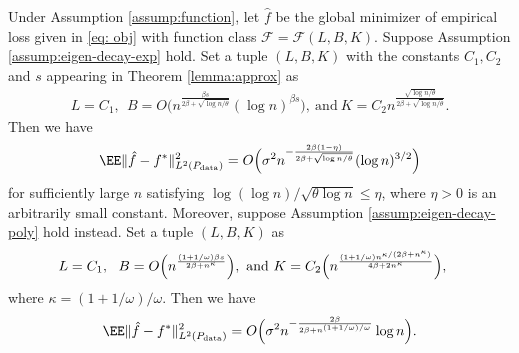 \begin{theorem}\label{thm:generalization-exp}
Under Assumption \ref{assump:function}, let $\hat{f}$ be the global minimizer of empirical loss given in \eqref{eq: obj} with function class 
$\mathcal{F}=\mathcal{F}(L,B,K)$. Suppose Assumption \ref{assump:eigen-decay-exp} hold. Set a tuple $(L,B,K)$ with the constants $C_1,C_2$ and $s$ appearing in Theorem \ref{lemma:approx} as 
\begin{equation*}
\begin{aligned}
    L= C_1,~~B = O\biggl(n^{\frac{\beta s}{2\beta+\sqrt{\log n/\theta}}} (\log n)^{\beta s} \biggr),~
    \text{and}~K = C_2 n^{\frac{\sqrt{\log n/\theta}}{2\beta + \sqrt{\log n/\theta} } }.
\end{aligned}
\end{equation*}
Then  we have 
\begin{equation*}
    \EE \norm{ \hat{f} - f^*}^2_{L^2(P_{\rm data})} = O\Bigl( \sigma^2 n^{- \frac{2\beta(1-\eta)}{2\beta+\sqrt{\log n/\theta}}}(\log n)^{3/2} \Bigr)
\end{equation*}
for sufficiently large $n$ satisfying $\log(\log n) / \sqrt{\theta \log n} \leq \eta$, where $\eta >0$ is an arbitrarily small constant.
Moreover, suppose Assumption \ref{assump:eigen-decay-poly} hold instead.  Set a tuple $(L,B,K)$ as \begin{equation*}
\begin{aligned}
        L= C_1,~~B&=O\Bigl(n^{\frac{(1+1/\omega)\beta s}{2\beta+ n^{\kappa}} } \Bigr),~\text{and}~K=C_2 \Bigl(n^{\frac{(1+1/\omega) n^{\kappa/(2\beta+n^\kappa)}}{4\beta + 2n^\kappa}} \Bigr),
\end{aligned}
\end{equation*}  
where $\kappa=(1+1/\omega)/\omega$. Then we have 
\begin{equation*}
     \EE \norm{ \hat{f} - f^*}^2_{L^2(P_{\rm data})} = O\Bigl( \sigma^2 n^{- \frac{2\beta}{2\beta+ n^{(1+1/\omega)/\omega}}} \log n\Bigr).
\end{equation*}
\end{theorem}

